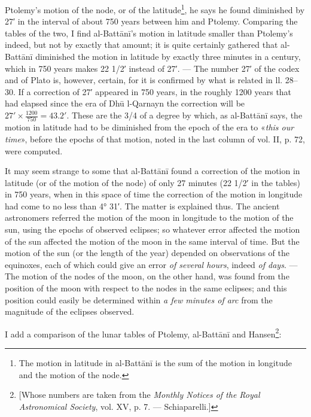 \documentclass[11pt]{article}
\begin{document}
\par Ptolemy's motion of the node, or of the latitude\footnote{The motion in latitude in al-Battānī is the sum of the motion in longitude and the motion of the node.}, he says he found diminished by 27′ in the interval of about 750 years between him and Ptolemy. Comparing the tables of the two, I find al-Battānī's motion in latitude smaller than Ptolemy's indeed, but not by exactly that amount; it is quite certainly gathered that al-Battānī diminished the motion in latitude by exactly three minutes in a century, which in 750 years makes 22 1/2′ instead of 27′. — The number 27′ of the codex and of Plato is, however, certain, for it is confirmed by what is related in ll. 28–30. If a correction of 27′ appeared in 750 years, in the roughly 1200 years that had elapsed since the era of Dhū l-Qarnayn the correction will be $27' \times \frac{1200}{750} = 43.2'$. These are the 3/4 of a degree by which, as al-Battānī says, the motion in latitude had to be diminished from the epoch of the era to «\emph{this our time}», before the epochs of that motion, noted in the last column of vol. II, p. 72, were computed.\par
\par It may seem strange to some that al-Battānī found a correction of the motion in latitude (or of the motion of the node) of only 27 minutes (22 1/2′ in the tables) in 750 years, when in this space of time the correction of the motion in longitude had come to no less than 4° 31′. The matter is explained thus. The ancient astronomers referred the motion of the moon in longitude to the motion of the sun, using the epochs of observed eclipses; so whatever error affected the motion of the sun affected the motion of the moon in the same interval of time. But the motion of the sun (or the length of the year) depended on observations of the equinoxes, each of which could give an error \emph{of several hours}, indeed \emph{of days}. — The motion of the nodes of the moon, on the other hand, was found from the position of the moon with respect to the nodes in the same eclipses; and this position could easily be determined within \emph{a few minutes of arc} from the magnitude of the eclipses observed.\par
\par I add a comparison of the lunar tables of Ptolemy, al-Battānī and Hansen\footnote{[Whose numbers are taken from the \emph{Monthly Notices of the Royal Astronomical Society}, vol. XV, p. 7. — Schiaparelli.]}:\par
\end{document}
